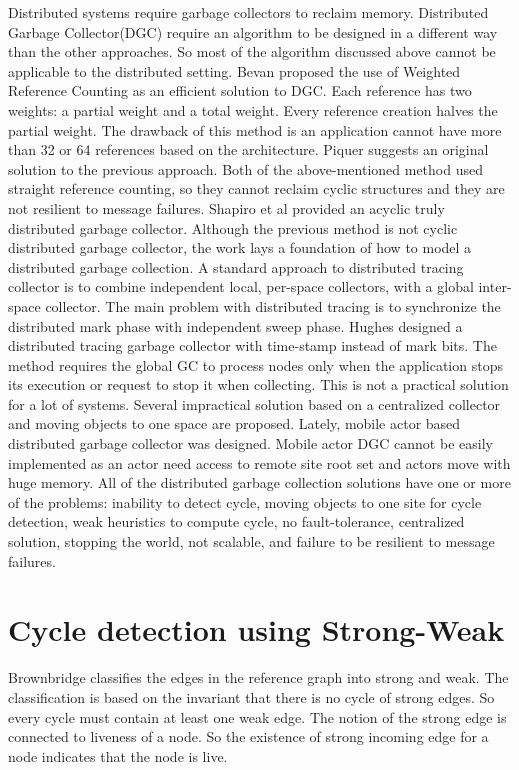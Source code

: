Distributed systems require garbage collectors to reclaim memory. Distributed Garbage Collector(DGC) require an algorithm to be designed in a different way than the other approaches. So most of the algorithm discussed above cannot be applicable to the distributed setting. Bevan\cite{Bevan87} proposed the use of Weighted Reference Counting as an efficient solution to DGC. Each reference has two weights: a partial weight and a total weight. Every reference creation halves the partial weight. The drawback of this method is an application cannot have more than 32 or 64 references based on the architecture. Piquer\cite{piquer91} suggests an original solution to the previous approach. Both of the above-mentioned method used straight reference counting, so they cannot reclaim cyclic structures and they are not resilient to message failures. Shapiro et al \cite{Shapiro92} provided an acyclic truly distributed garbage collector. Although the previous method is not cyclic distributed garbage collector, the work lays a foundation of how to model a  distributed garbage collection. A standard approach to distributed tracing collector is to combine independent local, per-space collectors, with a global inter-space collector. The main problem with distributed tracing is to synchronize the distributed mark phase with independent sweep phase\cite{plain95}. Hughes designed a distributed tracing garbage collector with  time-stamp instead of mark bits\cite{hugh85}. The method requires the global GC to process nodes only when the application stops its execution or request to stop it when collecting. This is not a practical solution for a lot of systems. Several impractical solution based on a centralized collector and moving objects to one space are proposed\cite{Maheshwari1997,Maheshwari1997b,Liskov,ladin,Veiga05}. Lately, mobile actor based distributed garbage collector was designed\cite{want}. Mobile actor DGC cannot be easily implemented as an actor need access to remote site root set and actors move with huge memory.  All of the distributed garbage collection solutions have one or more of the problems: inability to detect cycle, moving objects to one site for cycle detection, weak heuristics to compute cycle, no fault-tolerance, centralized solution, stopping the world, not scalable, and failure to be resilient to message failures.


\section{Cycle detection using Strong-Weak}
Brownbridge classifies the edges in the reference graph into strong and weak. The classification is based on the invariant that there is no cycle of strong edges. So every cycle must contain at least one weak edge. The notion of the strong edge is connected to liveness of a node. So  the existence of strong incoming edge for a node indicates that the node is live. 

